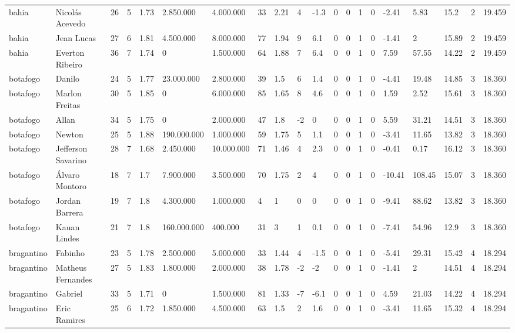 \begin{longtable}{llllllllllllllllllll}
bahia & Nicolás Acevedo & 26 & 5 & 1.73 & 2.850.000 & 4.000.000 & 33 & 2.21 & 4 & -1.3 & 0 & 0 & 1 & 0 & -2.41 & 5.83 & 15.2 & 2 & 19.459 \\
bahia & Jean Lucas & 27 & 6 & 1.81 & 4.500.000 & 8.000.000 & 77 & 1.94 & 9 & 6.1 & 0 & 0 & 1 & 0 & -1.41 & 2 & 15.89 & 2 & 19.459 \\
bahia & Everton Ribeiro & 36 & 7 & 1.74 & 0 & 1.500.000 & 64 & 1.88 & 7 & 6.4 & 0 & 0 & 1 & 0 & 7.59 & 57.55 & 14.22 & 2 & 19.459 \\
botafogo & Danilo & 24 & 5 & 1.77 & 23.000.000 & 2.800.000 & 39 & 1.5 & 6 & 1.4 & 0 & 0 & 1 & 0 & -4.41 & 19.48 & 14.85 & 3 & 18.360 \\
botafogo & Marlon Freitas & 30 & 5 & 1.85 & 0 & 6.000.000 & 85 & 1.65 & 8 & 4.6 & 0 & 0 & 1 & 0 & 1.59 & 2.52 & 15.61 & 3 & 18.360 \\
botafogo & Allan & 34 & 5 & 1.75 & 0 & 2.000.000 & 47 & 1.8 & -2 & 0 & 0 & 0 & 1 & 0 & 5.59 & 31.21 & 14.51 & 3 & 18.360 \\
botafogo & Newton & 25 & 5 & 1.88 & 190.000.000 & 1.000.000 & 59 & 1.75 & 5 & 1.1 & 0 & 0 & 1 & 0 & -3.41 & 11.65 & 13.82 & 3 & 18.360 \\
botafogo & Jefferson Savarino & 28 & 7 & 1.68 & 2.450.000 & 10.000.000 & 71 & 1.46 & 4 & 2.3 & 0 & 0 & 1 & 0 & -0.41 & 0.17 & 16.12 & 3 & 18.360 \\
botafogo & Álvaro Montoro & 18 & 7 & 1.7 & 7.900.000 & 3.500.000 & 70 & 1.75 & 2 & 4 & 0 & 0 & 1 & 0 & -10.41 & 108.45 & 15.07 & 3 & 18.360 \\
botafogo & Jordan Barrera & 19 & 7 & 1.8 & 4.300.000 & 1.000.000 & 4 & 1 & 0 & 0 & 0 & 0 & 1 & 0 & -9.41 & 88.62 & 13.82 & 3 & 18.360 \\
botafogo & Kauan Lindes & 21 & 7 & 1.8 & 160.000.000 & 400.000 & 31 & 3 & 1 & 0.1 & 0 & 0 & 1 & 0 & -7.41 & 54.96 & 12.9 & 3 & 18.360 \\
bragantino & Fabinho & 23 & 5 & 1.78 & 2.500.000 & 5.000.000 & 33 & 1.44 & 4 & -1.5 & 0 & 0 & 1 & 0 & -5.41 & 29.31 & 15.42 & 4 & 18.294 \\
bragantino & Matheus Fernandes & 27 & 5 & 1.83 & 1.800.000 & 2.000.000 & 38 & 1.78 & -2 & -2 & 0 & 0 & 1 & 0 & -1.41 & 2 & 14.51 & 4 & 18.294 \\
bragantino & Gabriel & 33 & 5 & 1.71 & 0 & 1.500.000 & 81 & 1.33 & -7 & -6.1 & 0 & 0 & 1 & 0 & 4.59 & 21.03 & 14.22 & 4 & 18.294 \\
bragantino & Eric Ramires & 25 & 6 & 1.72 & 1.850.000 & 4.500.000 & 63 & 1.5 & 2 & 1.6 & 0 & 0 & 1 & 0 & -3.41 & 11.65 & 15.32 & 4 & 18.294 \\

\end{longtable}
